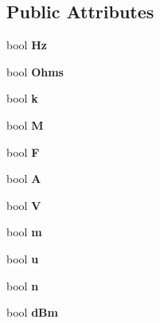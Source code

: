 \subsection*{Public Attributes}
\begin{DoxyCompactItemize}
\item 
\hypertarget{structFlags_a303b4b586da31534de55480d7012673c}{bool {\bfseries Hz}}\label{structFlags_a303b4b586da31534de55480d7012673c}

\item 
\hypertarget{structFlags_a5f33fa7811a65ddb67bcadb33501b757}{bool {\bfseries Ohms}}\label{structFlags_a5f33fa7811a65ddb67bcadb33501b757}

\item 
\hypertarget{structFlags_a64928a5b45606df51a78c33712305d59}{bool {\bfseries k}}\label{structFlags_a64928a5b45606df51a78c33712305d59}

\item 
\hypertarget{structFlags_a9c6824bccd0429e2502db2f09f7ca389}{bool {\bfseries M}}\label{structFlags_a9c6824bccd0429e2502db2f09f7ca389}

\item 
\hypertarget{structFlags_a1203a8b6d271d2bb44a1c6e515fb10e4}{bool {\bfseries F}}\label{structFlags_a1203a8b6d271d2bb44a1c6e515fb10e4}

\item 
\hypertarget{structFlags_a077d7fc9ad4328f5be164385e55ce9b2}{bool {\bfseries A}}\label{structFlags_a077d7fc9ad4328f5be164385e55ce9b2}

\item 
\hypertarget{structFlags_a9750f152539ef616f76a163bd6009198}{bool {\bfseries V}}\label{structFlags_a9750f152539ef616f76a163bd6009198}

\item 
\hypertarget{structFlags_a5ec31719223a75461c14fb1c00a2bf35}{bool {\bfseries m}}\label{structFlags_a5ec31719223a75461c14fb1c00a2bf35}

\item 
\hypertarget{structFlags_a61cb6fc897ed9d5b699ed03135057411}{bool {\bfseries u}}\label{structFlags_a61cb6fc897ed9d5b699ed03135057411}

\item 
\hypertarget{structFlags_a5c1dace20f5aa69a46f6d8ec477595f9}{bool {\bfseries n}}\label{structFlags_a5c1dace20f5aa69a46f6d8ec477595f9}

\item 
\hypertarget{structFlags_a6396346b074249be6cda7707e443c15d}{bool {\bfseries d\-Bm}}\label{structFlags_a6396346b074249be6cda7707e443c15d}


\end{DoxyCompactItemize}
